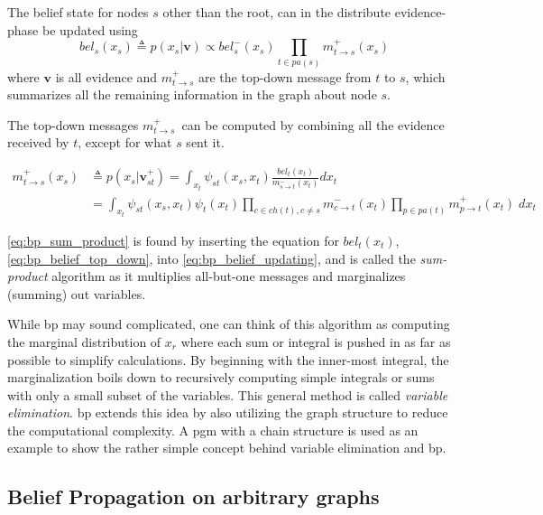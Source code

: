 The belief state for nodes $s$ other than the root, can in the distribute evidence-phase be updated using
\begin{equation}\label{eq:bp_belief_top_down}
    bel_s(x_s) \triangleq p(x_s | \mathbf{v}) \propto bel_s^-(x_s) \prod_{t \in pa(s)} m_{t \to s}^+(x_s)
\end{equation}
where $\mathbf{v}$ is all evidence and $m_{t \to s}^+$ are the top-down message from $t$ to $s$, which summarizes all the remaining information in the graph about node $s$. 

The top-down messages $m_{t \to s}^+$ can be computed by combining all the evidence received by $t$, except for what $s$ sent it.

\begin{subequations}
\begin{align}
    m_{t \to s}^+(x_s) &\triangleq p(x_s | \mathbf{v}_{st}^+) = \int_{x_t}\psi_{st}(x_s, x_t)\frac{bel_t(x_t)}{m_{s \to t}^-(x_t)}dx_t \label{eq:bp_belief_updating}\\
    &= \int_{x_t} \psi_{st}(x_s, x_t)\psi_t(x_t) \prod_{c \in ch(t), c \neq s} m_{c \to t}^-(x_t) \prod_{p \in pa(t)} m_{p \to t}^+(x_t) \; dx_t\label{eq:bp_sum_product}
\end{align}
\end{subequations}

\cref{eq:bp_sum_product} is found by inserting the equation for $bel_t(x_t)$, \cref{eq:bp_belief_top_down}, into \cref{eq:bp_belief_updating}, and is called the \textit{sum-product} algorithm as it multiplies all-but-one messages and marginalizes (summing) out variables. 

While \acrshort{bp} may sound complicated, one can think of this algorithm as computing the marginal distribution of $x_r$ where each sum or integral is pushed in as far as possible to simplify calculations. By beginning with the inner-most integral, the marginalization boils down to recursively computing simple integrals or sums with only a small subset of the variables. This general method is called \textit{variable elimination}\cite{murphy}. \acrshort{bp} extends this idea by also utilizing the graph structure to reduce the computational complexity. A \acrshort{pgm} with a chain structure is used as an example to show the rather simple concept behind variable elimination and \acrshort{bp}.

\subsection{Belief Propagation on arbitrary graphs}



